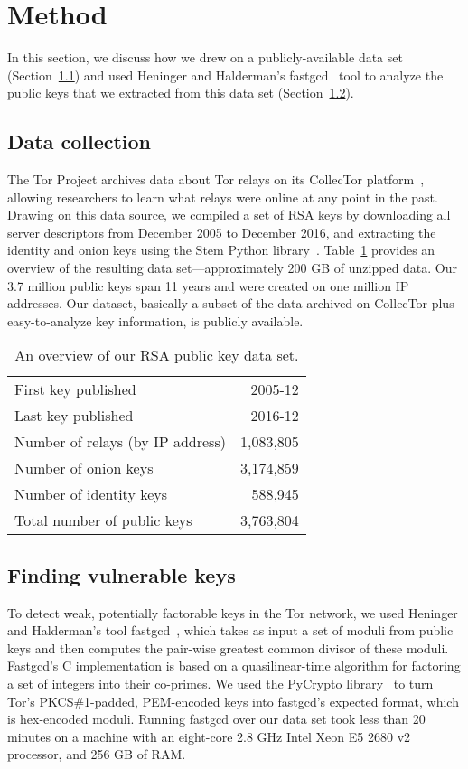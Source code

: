 \section{Method}
\label{sec:method}
In this section, we discuss how we drew on a publicly-available data set
(Section~\ref{sec:data-collection}) and used Heninger and Halderman's
fastgcd~\cite{fastgcd} tool to analyze the public keys that we extracted from
this data set (Section~\ref{sec:vulnerable-keys}).

\subsection{Data collection}
\label{sec:data-collection}
The Tor Project archives data about Tor relays on its CollecTor
platform~\cite{collector}, allowing researchers to learn what relays were online
at any point in the past.  Drawing on this data source, we compiled a set of RSA
keys by downloading all server descriptors from December 2005 to December 2016,
and extracting the identity and onion keys using the Stem Python
library~\cite{stem}.  Table~\ref{tab:dataset} provides an overview of the
resulting data set---approximately 200 GB of unzipped data.  Our 3.7 million
public keys span 11 years and were created on one million IP addresses.
Our dataset, basically a subset of the data archived on CollecTor plus
easy-to-analyze key information, is publicly available.

\begin{table}[t]
	\centering
	\begin{tabular}{l r}
	First key published & 2005-12 \\
	Last key published & 2016-12 \\

	\midrule

	Number of relays (by IP address) & 1,083,805 \\
	Number of onion keys & 3,174,859 \\
	Number of identity keys & 588,945 \\
	Total number of public keys & 3,763,804 \\
	\end{tabular}
	\caption{An overview of our RSA public key data set.}
	\label{tab:dataset}
\end{table}

\subsection{Finding vulnerable keys}
\label{sec:vulnerable-keys}
To detect weak, potentially factorable keys in the Tor network, we used Heninger
and Halderman's tool fastgcd~\cite{fastgcd}, which takes as input a set of
moduli from public keys and then computes the pair-wise greatest common divisor
of these moduli.  Fastgcd's C implementation is based on a quasilinear-time
algorithm for factoring a set of integers into their co-primes.  We used the
PyCrypto library~\cite{pycrypto} to turn Tor's PKCS\#1-padded, PEM-encoded keys
into fastgcd's expected format, which is hex-encoded moduli.  Running fastgcd
over our data set took less than 20 minutes on a machine with an eight-core 2.8
GHz Intel Xeon E5 2680 v2 processor, and 256 GB of RAM.

